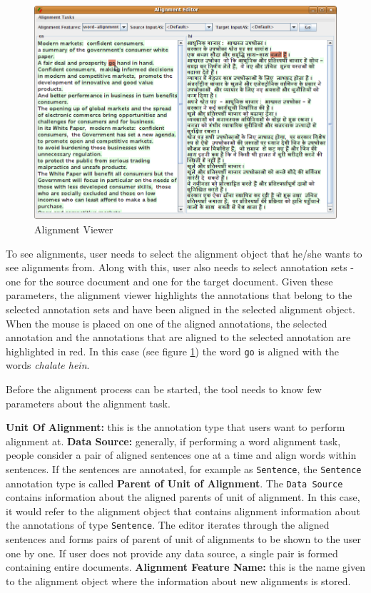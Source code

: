 \begin{figure}[ht]
\begin{center}
\includegraphics[width=\textwidth]{alignment-viewer.png}
\caption{Alignment Viewer}
\label{fig:alignment-viewer}
\end{center}
\end{figure}

To see alignments, user needs to select the alignment object that he/she wants 
to see alignments from.  Along with this, user also needs to select annotation 
sets - one for the source document and one for the target document. Given 
these parameters, the alignment viewer highlights the annotations that belong 
to the selected annotation sets and have been aligned in the selected alignment
object.   When the mouse is placed on one of the aligned annotations, the 
selected annotation and the annotations that are aligned to the selected 
annotation are highlighted in red. In this case (see figure 
\ref{fig:alignment-viewer}) the word {\tt go} is aligned with the words {\it 
chalate hein}. 

Before the alignment process can be started, the tool needs to know few 
parameters about the alignment task.

{\bf Unit Of Alignment:} this is the annotation type that users want to 
perform alignment at. {\bf Data Source:} generally, if performing a word 
alignment task, people consider a pair of aligned sentences one at a time and 
align words within sentences. If the sentences  are annotated, for example as 
{\tt Sentence}, the {\tt Sentence} annotation type is called {\bf Parent of 
Unit of Alignment}.  The {\tt Data Source} contains information about the 
aligned parents of unit of alignment. In this case, it would refer to the 
alignment object that contains alignment information about the annotations of 
type {\tt Sentence}. The editor iterates through the aligned sentences and forms
pairs of parent of unit of alignments to be shown to the user one by one.  If 
user does not provide any data source, a single pair is formed containing entire
documents. {\bf Alignment Feature Name:} this is the name given to the alignment 
object where the information about new alignments is stored.

